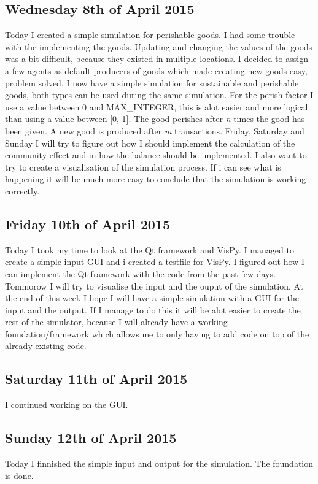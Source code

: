 \documentclass{article}
\begin{document}
\subsection{Wednesday 8th of April 2015}
Today I created a simple simulation for perishable goods. I had some trouble with the implementing the goods. Updating and changing the values of the goods was a bit difficult, because they existed in multiple locations. I decided to assign a few agents as default producers of goods which made creating new goods easy, problem solved. I now have a simple simulation for sustainable and perishable goods, both types can be used during the same simulation. For the perish factor I use a value between 0 and MAX\_INTEGER, this is alot easier and more logical than using a value between [0, 1]. The good perishes after \textit{n} times the good has been given. A new good is produced after \textit{m} transactions.
Friday, Saturday and Sunday I will try to figure out how I should implement the calculation of the community effect and in how the balance should be implemented. I also want to try to create a visualisation of the simulation process. If i can see what is happening it will be much more easy to conclude that the simulation is working correctly.

\subsection{Friday 10th of April 2015}
Today I took my time to look at the Qt framework and VisPy. I managed to create a simple input GUI and i created a testfile for VisPy. I figured out how I can implement the Qt framework with the code from the past few days. Tommorow I will try to visualise the input and the ouput of the simulation. At the end of this week I hope I will have a simple simulation with a GUI for the input and the output. If I manage to do this it will be alot easier to create the rest of the simulator, because I will already have a working foundation/framework which allows me to only having to add code on top of the already existing code.

\subsection{Saturday 11th of April 2015}
I continued working on the GUI.

\subsection{Sunday 12th of April 2015}
Today I finnished the simple input and output for the simulation. The foundation is done.
\end{document}
